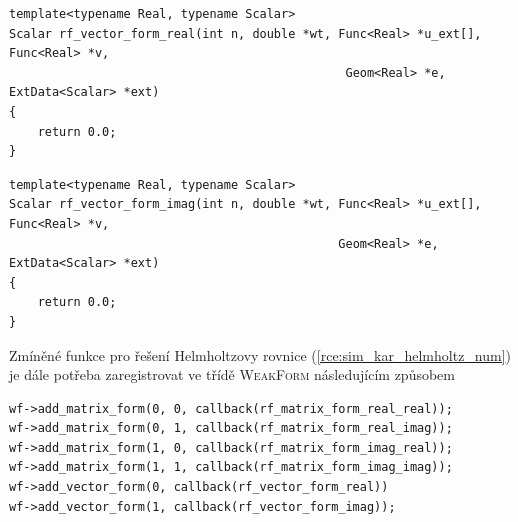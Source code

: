 \begin{verbatim}
template<typename Real, typename Scalar>
Scalar rf_vector_form_real(int n, double *wt, Func<Real> *u_ext[], Func<Real> *v,
                                               Geom<Real> *e, ExtData<Scalar> *ext)
{
    return 0.0;
}
\end{verbatim}
\begin{verbatim}
template<typename Real, typename Scalar>
Scalar rf_vector_form_imag(int n, double *wt, Func<Real> *u_ext[], Func<Real> *v, 
                                              Geom<Real> *e, ExtData<Scalar> *ext)
{
    return 0.0;
}
\end{verbatim}
Zmíněné funkce pro řešení Helmholtzovy rovnice (\ref{rce:sim_kar_helmholtz_num}) je dále potřeba zaregistrovat ve třídě \textsc{WeakForm} následujícím způsobem
\begin{verbatim}
wf->add_matrix_form(0, 0, callback(rf_matrix_form_real_real));
wf->add_matrix_form(0, 1, callback(rf_matrix_form_real_imag));
wf->add_matrix_form(1, 0, callback(rf_matrix_form_imag_real));
wf->add_matrix_form(1, 1, callback(rf_matrix_form_imag_imag));
wf->add_vector_form(0, callback(rf_vector_form_real))
wf->add_vector_form(1, callback(rf_vector_form_imag));
\end{verbatim}

